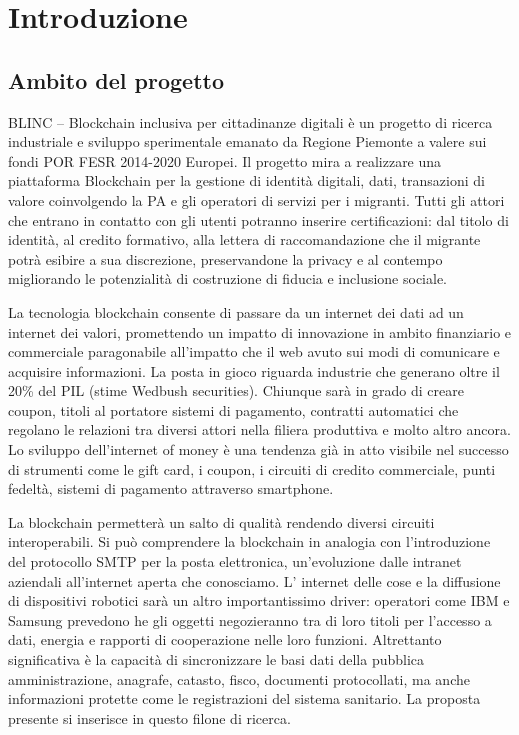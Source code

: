 \chapter{Introduzione}

\section{Ambito del progetto}
BLINC – Blockchain inclusiva per cittadinanze digitali è un progetto di ricerca industriale e sviluppo sperimentale emanato da Regione Piemonte
a valere sui fondi POR FESR 2014-2020 Europei. Il progetto mira a realizzare una piattaforma Blockchain per la gestione di identità digitali,
dati, transazioni di valore coinvolgendo la PA e gli operatori di servizi per i migranti.
Tutti gli attori che entrano in contatto con gli utenti potranno inserire certificazioni:
dal titolo di identità, al credito formativo, alla lettera di raccomandazione che il migrante
potrà esibire a sua discrezione, preservandone la privacy e al contempo migliorando le potenzialità di costruzione di fiducia e inclusione sociale.

La tecnologia blockchain consente di passare da un internet dei dati ad un internet dei valori, promettendo un impatto di innovazione in ambito
finanziario e commerciale paragonabile all’impatto che il web avuto sui modi di comunicare e acquisire informazioni.
La posta in gioco riguarda industrie che generano oltre il 20\% del PIL (stime Wedbush securities). Chiunque sarà in grado di creare coupon,
titoli al portatore sistemi di pagamento, contratti automatici che regolano le relazioni tra diversi attori nella filiera produttiva e molto altro ancora.
Lo sviluppo dell’internet of money è una tendenza già in atto visibile nel successo di strumenti come le gift card, i coupon, i circuiti di credito commerciale,
punti fedeltà, sistemi di pagamento attraverso smartphone.

La blockchain permetterà un salto di qualità rendendo diversi circuiti interoperabili. Si può comprendere la blockchain
in analogia con l’introduzione del protocollo SMTP per la posta elettronica, un’evoluzione dalle intranet aziendali all’internet aperta che conosciamo.
L’ internet delle cose e la diffusione di dispositivi robotici sarà un altro importantissimo driver: operatori come IBM e Samsung prevedono 
he gli oggetti negozieranno tra di loro titoli per l’accesso a dati, energia e rapporti di cooperazione nelle loro funzioni.
Altrettanto significativa è la capacità di sincronizzare le basi dati della pubblica amministrazione, anagrafe, catasto, fisco,
documenti protocollati, ma anche informazioni protette come le registrazioni del sistema sanitario. La proposta presente si inserisce in questo filone di ricerca.

